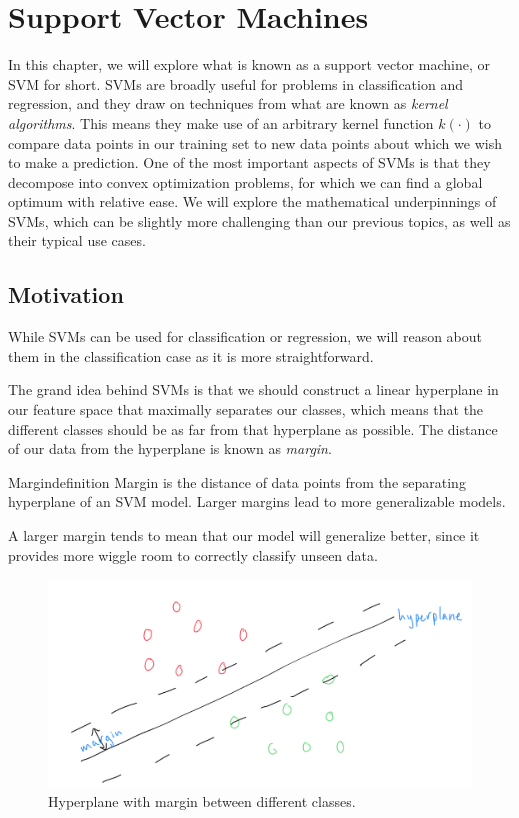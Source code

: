 \chapter{Support Vector Machines}
In this chapter, we will explore what is known as a support vector machine, or SVM for short. SVMs are broadly useful for problems in classification and regression, and they draw on techniques from what are known as \textit{kernel algorithms}. This means they make use of an arbitrary kernel function $k(\cdot)$ to compare data points in our training set to new data points about which we wish to make a prediction. One of the most important aspects of SVMs is that they decompose into convex optimization problems, for which we can find a global optimum with relative ease. We will explore the mathematical underpinnings of SVMs, which can be slightly more challenging than our previous topics, as well as their typical use cases.

\section{Motivation}
While SVMs can be used for classification or regression, we will reason about them in the classification case as it is more straightforward. 

The grand idea behind SVMs is that we should construct a linear hyperplane in our feature space that maximally separates our classes, which means that the different classes should be as far from that hyperplane as possible. The distance of our data from the hyperplane is known as \textit{margin}.

\begin{definition}{Margin}{definition}
Margin is the distance of data points from the separating hyperplane of an SVM model. Larger margins lead to more generalizable models.
\end{definition}

A larger margin tends to mean that our model will generalize better, since it provides more wiggle room to correctly classify unseen data.

\begin{figure}
    \centering
    \includegraphics[width=0.5\paperwidth]{../SupportVectorMachines/fig/2d-hyperplane.png}
    \caption{Hyperplane with margin between different classes.}
    \label{fig:2d-hyperplane}
\end{figure}

